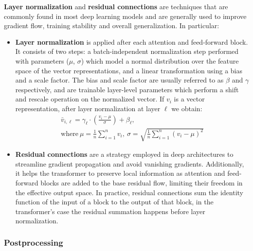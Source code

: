 \textbf{Layer normalization} and \textbf{residual connections} are techniques that are commonly found in most deep learning models and are generally used to improve gradient flow, training stability and overall generalization.
In particular:
\begin{itemize}
    \item \textbf{Layer normalization}  is applied after each attention and feed-forward block.
It consists of two steps: a batch-independent normalization step performed with parameters ($\mu$, $\sigma$) which model a normal distribution over the feature space of the vector representations, and a linear transformation using a bias and a scale factor.
The bias and scale factor are usually referred to as $\beta$ and $\gamma$ respectively, and are trainable layer-level parameters which perform a shift and rescale operation on the normalized vector.
If $v_i$ is a vector representation, after layer normalization at layer $\ell$ we obtain:
\begin{subequations}
    \begin{gather}
        \bar v_{i,\ell} = \gamma_\ell \cdot \left( \frac{v_i - \mu}{\sigma} \right) + \beta_\ell, \label{eq:background_layernorm} \\
        \text{where}\ \mu = \frac{1}{n}\sum_{i=1}^{n}{v_i},\ \sigma = \sqrt{\frac{1}{n}\sum_{i=1}^{n}{{(v_i - \mu)}^2}} \label{eq:background_layernorm_extra}
    \end{gather}
\end{subequations}
    \item \textbf{Residual connections}  are a strategy employed in deep architectures to streamline gradient propagation and avoid vanishing gradients.
Additionally, it helps the transformer to preserve local information as attention and feed-forward blocks are added to the base residual flow, limiting their freedom in the effective output space.
In practice, residual connections sum the identity function of the input of a block to the output of that block, in the transformer's case the residual summation happens before layer normalization.
\end{itemize}

\subsubsection*{Postprocessing}

